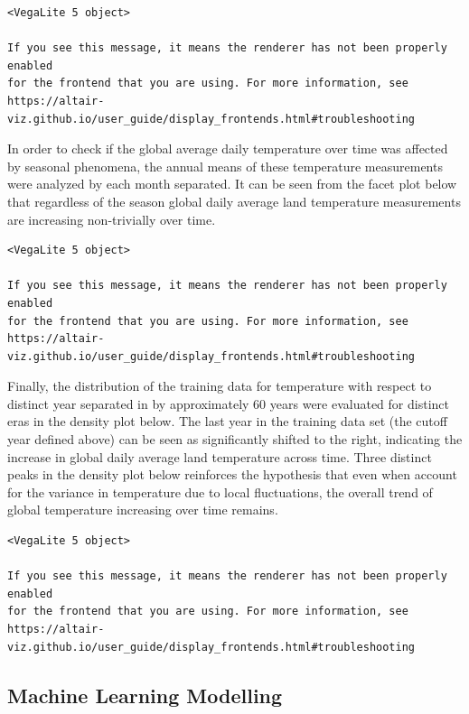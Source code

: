 \documentclass[
  letterpaper,
  DIV=11,
  numbers=noendperiod]{scrartcl}
\begin{document}
\begin{verbatim}
<VegaLite 5 object>

If you see this message, it means the renderer has not been properly enabled
for the frontend that you are using. For more information, see
https://altair-viz.github.io/user_guide/display_frontends.html#troubleshooting
\end{verbatim}

In order to check if the global average daily temperature over time was
affected by seasonal phenomena, the annual means of these temperature
measurements were analyzed by each month separated. It can be seen from
the facet plot below that regardless of the season global daily average
land temperature measurements are increasing non-trivially over time.

\begin{verbatim}
<VegaLite 5 object>

If you see this message, it means the renderer has not been properly enabled
for the frontend that you are using. For more information, see
https://altair-viz.github.io/user_guide/display_frontends.html#troubleshooting
\end{verbatim}

Finally, the distribution of the training data for temperature with
respect to distinct year separated in by approximately 60 years were
evaluated for distinct eras in the density plot below. The last year in
the training data set (the cutoff year defined above) can be seen as
significantly shifted to the right, indicating the increase in global
daily average land temperature across time. Three distinct peaks in the
density plot below reinforces the hypothesis that even when account for
the variance in temperature due to local fluctuations, the overall trend
of global temperature increasing over time remains.

\begin{verbatim}
<VegaLite 5 object>

If you see this message, it means the renderer has not been properly enabled
for the frontend that you are using. For more information, see
https://altair-viz.github.io/user_guide/display_frontends.html#troubleshooting
\end{verbatim}

\subsection{Machine Learning
Modelling}\label{machine-learning-modelling}
\end{document}

